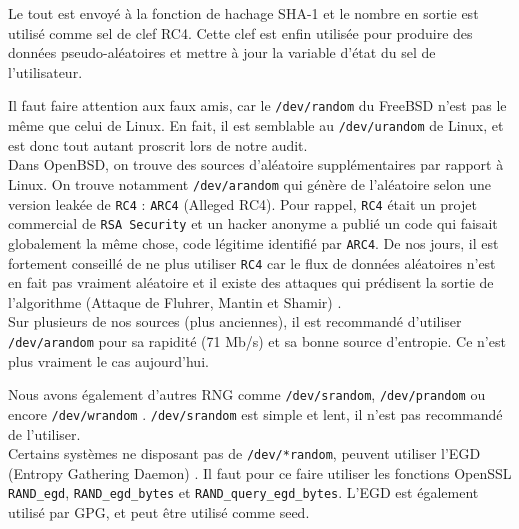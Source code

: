 			Le tout est envoyé à la fonction de hachage SHA-1 et le nombre en 
			sortie est utilisé comme sel de clef RC4.  
			Cette clef est enfin utilisée pour produire des données 
			pseudo-aléatoires et mettre à jour la variable d'état du sel de 
			l'utilisateur. 
			
			
			Il faut faire attention aux faux amis, car le \texttt{/dev/random} 
			du FreeBSD n'est pas le même que celui de Linux.
			En fait, il est semblable au \texttt{/dev/urandom} de Linux, 
			et est donc tout autant proscrit lors de notre audit.\\
			
			Dans OpenBSD, on trouve des sources d'aléatoire supplémentaires 
			par rapport à Linux. On trouve notamment \texttt{/dev/arandom} qui 
			génère de l'aléatoire selon une version leakée de \texttt{RC4} :
			\texttt{ARC4} (Alleged RC4). Pour rappel, \texttt{RC4} était 
			un projet commercial de \texttt{RSA Security} et un hacker 
			anonyme a publié un code qui faisait globalement la même chose, 
			code légitime identifié par \texttt{ARC4}. 
			De nos jours, il est fortement conseillé de ne plus utiliser
			\texttt{RC4} car le flux de données aléatoires n'est en fait pas vraiment 
			aléatoire et il existe des attaques qui prédisent la sortie de 
			l'algorithme (Attaque de Fluhrer, Mantin et Shamir) 
			\nocite{Fluhrer01weaknessesin}.	\\
			
			
			Sur plusieurs de nos sources (plus anciennes), il est recommandé
			d'utiliser \texttt{/dev/arandom} pour sa rapidité 
			(71 Mb/s) et sa bonne source d'entropie. 
			Ce n'est plus vraiment le cas aujourd'hui.\\

	
		
			Nous avons également d'autres RNG comme \texttt{/dev/srandom},
			\texttt{/dev/prandom} ou encore \texttt{/dev/wrandom}
			\cite{miros2013}. \texttt{/dev/srandom} est simple et lent, il n'est pas recommandé de 
			l'utiliser.\\
		
			Certains systèmes ne disposant pas de \texttt{/dev/*random}, 
			peuvent utiliser l'EGD (Entropy Gathering Daemon) 
			\cite{egdsf.net}. Il faut pour ce faire utiliser les fonctions OpenSSL \texttt{RAND\_egd},  \texttt{RAND\_egd\_bytes} et \texttt{RAND\_query\_egd\_bytes}. L'EGD est également utilisé par GPG, et peut être utilisé comme seed.
			
